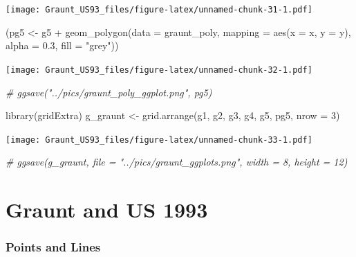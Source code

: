 \documentclass[
]{article}
\newenvironment{Shaded}{\begin{snugshade}}{\end{snugshade}}
\newcommand{\AttributeTok}[1]{\textcolor[rgb]{0.77,0.63,0.00}{#1}}
\newcommand{\CommentTok}[1]{\textcolor[rgb]{0.56,0.35,0.01}{\textit{#1}}}
\newcommand{\DecValTok}[1]{\textcolor[rgb]{0.00,0.00,0.81}{#1}}
\newcommand{\FloatTok}[1]{\textcolor[rgb]{0.00,0.00,0.81}{#1}}
\newcommand{\FunctionTok}[1]{\textcolor[rgb]{0.00,0.00,0.00}{#1}}
\newcommand{\NormalTok}[1]{#1}
\newcommand{\OtherTok}[1]{\textcolor[rgb]{0.56,0.35,0.01}{#1}}
\newcommand{\SpecialCharTok}[1]{\textcolor[rgb]{0.00,0.00,0.00}{#1}}
\newcommand{\StringTok}[1]{\textcolor[rgb]{0.31,0.60,0.02}{#1}}
\begin{document}
\texttt{[image: Graunt\_US93\_files/figure-latex/unnamed-chunk-31-1.pdf]}

\begin{Shaded}
\begin{Highlighting}[]
\NormalTok{(pg5 }\OtherTok{\textless{}{-}}\NormalTok{ g5 }\SpecialCharTok{+}
  \FunctionTok{geom\_polygon}\NormalTok{(}\AttributeTok{data =}\NormalTok{ graunt\_poly, }
               \AttributeTok{mapping =} \FunctionTok{aes}\NormalTok{(}\AttributeTok{x =}\NormalTok{ x, }\AttributeTok{y =}\NormalTok{ y), }
               \AttributeTok{alpha =} \FloatTok{0.3}\NormalTok{, }\AttributeTok{fill =} \StringTok{"grey"}\NormalTok{))}
\end{Highlighting}
\end{Shaded}

\texttt{[image: Graunt\_US93\_files/figure-latex/unnamed-chunk-32-1.pdf]}

\begin{Shaded}
\begin{Highlighting}[]
\CommentTok{\# ggsave("../pics/graunt\_poly\_ggplot.png", pg5)}
\end{Highlighting}
\end{Shaded}

\begin{Shaded}
\begin{Highlighting}[]
\FunctionTok{library}\NormalTok{(gridExtra)}
\NormalTok{g\_graunt }\OtherTok{\textless{}{-}} \FunctionTok{grid.arrange}\NormalTok{(g1, g2, g3, g4, g5, pg5, }\AttributeTok{nrow =} \DecValTok{3}\NormalTok{)}
\end{Highlighting}
\end{Shaded}

\texttt{[image: Graunt\_US93\_files/figure-latex/unnamed-chunk-33-1.pdf]}

\begin{Shaded}
\begin{Highlighting}[]
\CommentTok{\# ggsave(g\_graunt, file = "../pics/graunt\_ggplots.png", width = 8, height = 12)}
\end{Highlighting}
\end{Shaded}

\hypertarget{graunt-and-us-1993}{%
\section{Graunt and US 1993}\label{graunt-and-us-1993}}

\hypertarget{points-and-lines}{%
\subsubsection{Points and Lines}\label{points-and-lines}}
\end{document}
